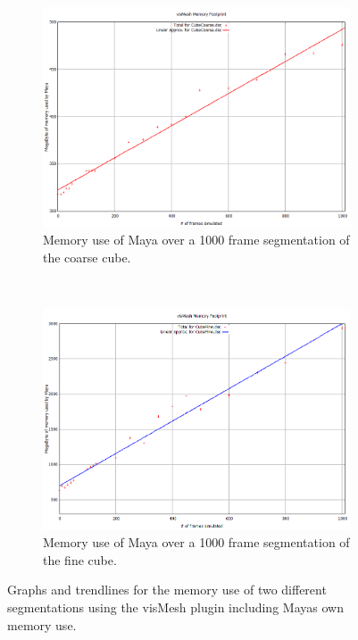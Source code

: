 \begin{figure}
        \centering
        \begin{subfigure}[t]{1\textwidth}
                \includegraphics[width=\textwidth]{img/cubeCoarse-graph.png}
                \caption{Memory use of Maya over a 1000 frame segmentation of
                the coarse cube.}
                \label{fig:memorycoarse}
        \end{subfigure}%
\\
        \begin{subfigure}[t]{1\textwidth}
                \includegraphics[width=\textwidth]{img/cubeFine-graph.png}
                \caption{Memory use of Maya over a 1000 frame segmentation of
                the fine cube.}
                \label{fig:memoryfine}
        \end{subfigure}

        \caption{Graphs and trendlines for the memory use of two different
        segmentations using the visMesh plugin including Mayas own memory use.}
        \label{fig:membenchmarks}
\end{figure}

